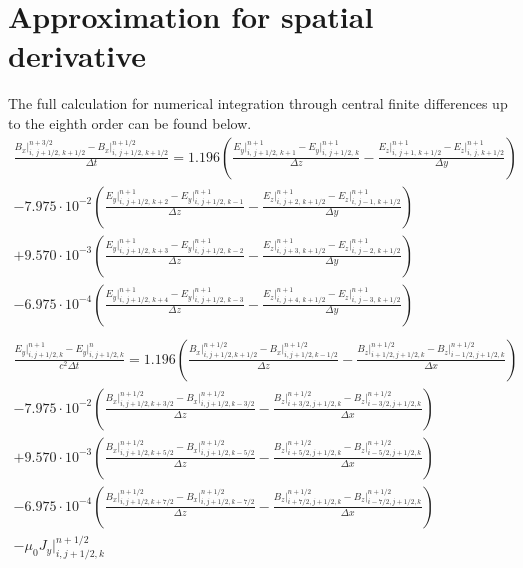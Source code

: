 \documentclass[bachelor_thesis]{subfiles}
\begin{document}
\appendix
\chapter{Approximation for spatial derivative} \label{chap:numMaxwell}

The full calculation for numerical integration through central finite differences up to the eighth order can be found below.
\begin{align*}
\frac{{B}_x\rvert_{i,\, j+1/2,\, k+1/2}^{n+3/2} - {B}_x\rvert_{i,\, j+1/2,\, k+1/2}^{n+1/2}}{\Delta t}
	= 1.196 \left(\frac{{E}_y\rvert_{i,\, j+1/2,\, k+1}^{n+1} - {E}_y\rvert_{i,\, j+1/2,\, k}^{n+1}}{\Delta z}
	- \frac{{E}_z\rvert_{i,\, j+1,\, k+1/2}^{n+1} - {E}_z\rvert_{i,\, j,\, k+1/2}^{n+1}}{\Delta y}\right)			\\
	- 7.975\cdot 10^{-2} \left(\frac{{E}_y\rvert_{i,\, j+1/2,\, k+2}^{n+1} - {E}_y\rvert_{i,\, j+1/2,\, k-1}^{n+1}}{\Delta z}
	- \frac{{E}_z\rvert_{i,\, j+2,\, k+1/2}^{n+1} - {E}_z\rvert_{i,\, j-1,\, k+1/2}^{n+1}}{\Delta y}\right)			\\
	+ 9.570\cdot 10^{-3} \left(\frac{{E}_y\rvert_{i,\, j+1/2,\, k+3}^{n+1} - {E}_y\rvert_{i,\, j+1/2,\, k-2}^{n+1}}{\Delta z}
	- \frac{{E}_z\rvert_{i,\, j+3,\, k+1/2}^{n+1} - {E}_z\rvert_{i,\, j-2,\, k+1/2}^{n+1}}{\Delta y}\right)			\\
	- 6.975\cdot 10^{-4} \left(\frac{{E}_y\rvert_{i,\, j+1/2,\, k+4}^{n+1} - {E}_y\rvert_{i,\, j+1/2,\, k-3}^{n+1}}{\Delta z}
	- \frac{{E}_z\rvert_{i,\, j+4,\, k+1/2}^{n+1} - {E}_z\rvert_{i,\, j-3,\, k+1/2}^{n+1}}{\Delta y}\right)			\\ \\
\frac{E_y\rvert_{i, j+1/2, k}^{n+1} - E_y\rvert_{i, j+1/2, k}^{n}}{c^2 \Delta t} 
	= 1.196 \left(\frac{B_x\rvert_{i, j+1/2, k+1/2}^{n+1/2} - B_x\rvert_{i, j+1/2, k-1/2}^{n+1/2}}{\Delta z}
	 - \frac{B_z\rvert_{i+1/2, j+1/2, k}^{n+1/2} - B_z\rvert_{i-1/2, j+1/2, k}^{n+1/2}}{\Delta x}\right)			\\
 	- 7.975\cdot 10^{-2} \left(\frac{B_x\rvert_{i, j+1/2, k+3/2}^{n+1/2} - B_x\rvert_{i, j+1/2, k-3/2}^{n+1/2}}{\Delta z}
 	 -\frac{B_z\rvert_{i+3/2, j+1/2, k}^{n+1/2} - B_z\rvert_{i-3/2, j+1/2, k}^{n+1/2}}{\Delta x}\right)			\\
 	+ 9.570\cdot 10^{-3} \left(\frac{B_x\rvert_{i, j+1/2, k+5/2}^{n+1/2} - B_x\rvert_{i, j+1/2, k-5/2}^{n+1/2}}{\Delta z}
 	- \frac{B_z\rvert_{i+5/2, j+1/2, k}^{n+1/2} - B_z\rvert_{i-5/2, j+1/2, k}^{n+1/2}}{\Delta x}\right)			\\
 	- 6.975\cdot 10^{-4} \left(\frac{B_x\rvert_{i, j+1/2, k+7/2}^{n+1/2} - B_x\rvert_{i, j+1/2, k-7/2}^{n+1/2}}{\Delta z}
	-\frac{B_z\rvert_{i+7/2, j+1/2, k}^{n+1/2} - B_z\rvert_{i-7/2, j+1/2, k}^{n+1/2}}{\Delta x}\right)			\\
 	- \mu_0 J_y\rvert_{i, j+1/2, k}^{n+1/2}
\end{align*}
\end{document}
